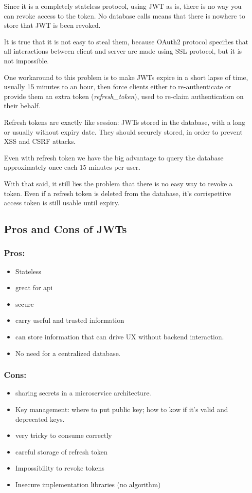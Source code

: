 \documentclass[20pt]{style}
\begin{document}
Since it is a completely stateless protocol, using JWT as is, there is no way
you can revoke access to the token. No database calls means that there is
nowhere to store that JWT is been revoked.

It is true that it is not easy to steal them, because OAuth2 protocol specifies
that all interactions between client and server are made using SSL protocol, but
it is not impossible.

One workaround to this problem is to make JWTs expire in a short lapse of time,
usually 15 minutes to an hour, then force clients either to re-authenticate or
provide them an extra token (\textit{refresh\_token}), used to re-claim
authentication on their behalf.

Refresh tokens are exactly like session: JWTs stored in the database, with a
long or usually without expiry date.
They should securely stored, in order to prevent XSS and CSRF attacks.

Even with refresh token we have the big advantage to query the database
approximately once each 15 minutes per user.

With that said, it still lies the problem that there is no easy way to revoke a
token. Even if a refresh token is deleted from the database, it's corrispettive
access token is still usable until expiry.

\subsection{Pros and Cons of JWTs}
\subsubsection{Pros:}
\begin{itemize}
    \item Stateless
    \item great for api
    \item secure
    \item carry useful and trusted information
    \item can store information that can drive UX without backend interaction.
    \item No need for a centralized database.
\end{itemize}
\subsubsection{Cons:}
\begin{itemize}
    \item sharing secrets in a microservice architecture.
    \item Key management: where to put public key; how to kow if it's valid and
        deprecated keys.
    \item very tricky to consume correctly
    \item careful storage of refresh token
    \item Impossibility to revoke tokens
    \item Insecure implementation libraries (no algorithm)
\end{itemize}
\end{document}

